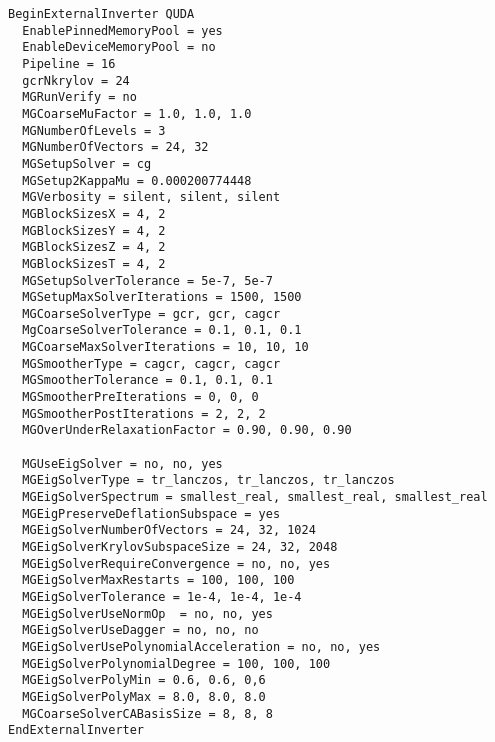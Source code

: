 \begin{verbatim}
BeginExternalInverter QUDA
  EnablePinnedMemoryPool = yes
  EnableDeviceMemoryPool = no
  Pipeline = 16
  gcrNkrylov = 24
  MGRunVerify = no
  MGCoarseMuFactor = 1.0, 1.0, 1.0
  MGNumberOfLevels = 3
  MGNumberOfVectors = 24, 32
  MGSetupSolver = cg
  MGSetup2KappaMu = 0.000200774448
  MGVerbosity = silent, silent, silent
  MGBlockSizesX = 4, 2
  MGBlockSizesY = 4, 2
  MGBlockSizesZ = 4, 2
  MGBlockSizesT = 4, 2
  MGSetupSolverTolerance = 5e-7, 5e-7
  MGSetupMaxSolverIterations = 1500, 1500
  MGCoarseSolverType = gcr, gcr, cagcr
  MgCoarseSolverTolerance = 0.1, 0.1, 0.1
  MGCoarseMaxSolverIterations = 10, 10, 10
  MGSmootherType = cagcr, cagcr, cagcr
  MGSmootherTolerance = 0.1, 0.1, 0.1
  MGSmootherPreIterations = 0, 0, 0
  MGSmootherPostIterations = 2, 2, 2
  MGOverUnderRelaxationFactor = 0.90, 0.90, 0.90

  MGUseEigSolver = no, no, yes
  MGEigSolverType = tr_lanczos, tr_lanczos, tr_lanczos
  MGEigSolverSpectrum = smallest_real, smallest_real, smallest_real
  MGEigPreserveDeflationSubspace = yes
  MGEigSolverNumberOfVectors = 24, 32, 1024
  MGEigSolverKrylovSubspaceSize = 24, 32, 2048
  MGEigSolverRequireConvergence = no, no, yes
  MGEigSolverMaxRestarts = 100, 100, 100
  MGEigSolverTolerance = 1e-4, 1e-4, 1e-4
  MGEigSolverUseNormOp  = no, no, yes
  MGEigSolverUseDagger = no, no, no
  MGEigSolverUsePolynomialAcceleration = no, no, yes
  MGEigSolverPolynomialDegree = 100, 100, 100
  MGEigSolverPolyMin = 0.6, 0.6, 0,6
  MGEigSolverPolyMax = 8.0, 8.0, 8.0
  MGCoarseSolverCABasisSize = 8, 8, 8
EndExternalInverter
\end{verbatim}

